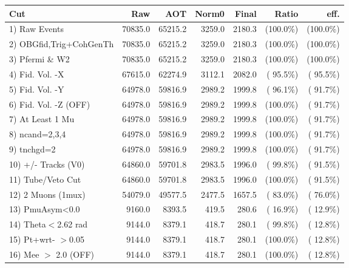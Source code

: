  \begin{table}[h!]\centering
 \begin{tabular}{||l||r|r|r|r|r|r||}
 \hline
 \hline
 Cut & Raw & AOT & Norm0 & Final & Ratio & eff.       \\
 \hline
  1) Raw Events           &      70835.0 &      65215.2 &       3259.0 &       2180.3 & (100.0\%) & (100.0\%) \\
  2) OBGfid,Trig+CohGenTh &      70835.0 &      65215.2 &       3259.0 &       2180.3 & (100.0\%) & (100.0\%) \\
  3) Pfermi \& W2         &      70835.0 &      65215.2 &       3259.0 &       2180.3 & (100.0\%) & (100.0\%) \\
  4) Fid. Vol. -X         &      67615.0 &      62274.9 &       3112.1 &       2082.0 & ( 95.5\%) & ( 95.5\%) \\
  5) Fid. Vol. -Y         &      64978.0 &      59816.9 &       2989.2 &       1999.8 & ( 96.1\%) & ( 91.7\%) \\
  6) Fid. Vol. -Z (OFF)   &      64978.0 &      59816.9 &       2989.2 &       1999.8 & (100.0\%) & ( 91.7\%) \\
  7) At Least 1 Mu        &      64978.0 &      59816.9 &       2989.2 &       1999.8 & (100.0\%) & ( 91.7\%) \\
  8) ncand=2,3,4          &      64978.0 &      59816.9 &       2989.2 &       1999.8 & (100.0\%) & ( 91.7\%) \\
  9) tnchgd=2             &      64978.0 &      59816.9 &       2989.2 &       1999.8 & (100.0\%) & ( 91.7\%) \\
 10) +/- Tracks (V0)      &      64860.0 &      59701.8 &       2983.5 &       1996.0 & ( 99.8\%) & ( 91.5\%) \\
 11) Tube/Veto Cut        &      64860.0 &      59701.8 &       2983.5 &       1996.0 & (100.0\%) & ( 91.5\%) \\
 12) 2 Muons (1mux)       &      54079.0 &      49577.5 &       2477.5 &       1657.5 & ( 83.0\%) & ( 76.0\%) \\
 13) PmuAsym<0.0          &       9160.0 &       8393.5 &        419.5 &        280.6 & ( 16.9\%) & ( 12.9\%) \\
 14) Theta$<$2.62 rad     &       9144.0 &       8379.1 &        418.7 &        280.1 & ( 99.8\%) & ( 12.8\%) \\
 15) Pt+wrt- $>$0.05      &       9144.0 &       8379.1 &        418.7 &        280.1 & (100.0\%) & ( 12.8\%) \\
 16) Mee $>$ 2.0  (OFF)   &       9144.0 &       8379.1 &        418.7 &        280.1 & (100.0\%) & ( 12.8\%) \\

\end{tabular}
\end{table}
